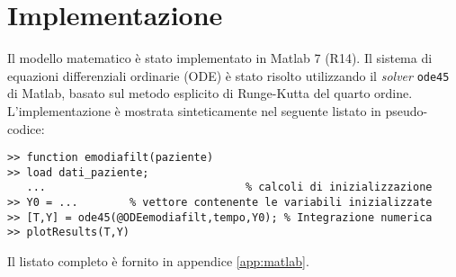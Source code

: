\section{Implementazione}
Il modello matematico è stato implementato in Matlab\textsuperscript\textregistered{} 7 (R14). Il sistema di equazioni differenziali ordinarie (ODE) è stato risolto utilizzando il \textit{solver} \verb|ode45| di Matlab, basato sul metodo esplicito di Runge-Kutta del quarto ordine. L'implementazione è mostrata sinteticamente nel seguente listato in pseudo-codice:
\begin{verbatim}
>> function emodiafilt(paziente)
>> load dati_paziente; 
   ...                               % calcoli di inizializzazione
>> Y0 = ...        % vettore contenente le variabili inizializzate
>> [T,Y] = ode45(@ODEemodiafilt,tempo,Y0); % Integrazione numerica
>> plotResults(T,Y)
\end{verbatim}
Il listato completo è fornito in appendice \ref{app:matlab}.